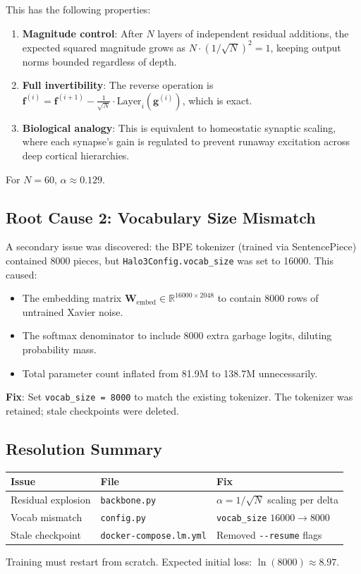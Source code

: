 This has the following properties:
\begin{enumerate}
    \item \textbf{Magnitude control}: After $N$ layers of independent residual additions, the expected squared magnitude grows as $N \cdot (1/\sqrt{N})^2 = 1$, keeping output norms bounded regardless of depth.
    \item \textbf{Full invertibility}: The reverse operation is $\mathbf{f}^{(i)} = \mathbf{f}^{(i+1)} - \frac{1}{\sqrt{N}} \cdot \text{Layer}_i(\mathbf{g}^{(i)})$, which is exact.
    \item \textbf{Biological analogy}: This is equivalent to homeostatic synaptic scaling, where each synapse's gain is regulated to prevent runaway excitation across deep cortical hierarchies.
\end{enumerate}

For $N = 60$, $\alpha \approx 0.129$.

\subsection{Root Cause 2: Vocabulary Size Mismatch}

A secondary issue was discovered: the BPE tokenizer (trained via SentencePiece) contained 8000 pieces, but \texttt{Halo3Config.vocab\_size} was set to 16000. This caused:
\begin{itemize}
    \item The embedding matrix $\mathbf{W}_{\text{embed}} \in \mathbb{R}^{16000 \times 2048}$ to contain 8000 rows of untrained Xavier noise.
    \item The softmax denominator to include 8000 extra garbage logits, diluting probability mass.
    \item Total parameter count inflated from 81.9M to 138.7M unnecessarily.
\end{itemize}

\textbf{Fix}: Set \texttt{vocab\_size = 8000} to match the existing tokenizer. The tokenizer was retained; stale checkpoints were deleted.

\subsection{Resolution Summary}

\begin{center}
\begin{tabular}{lll}
\hline
\textbf{Issue} & \textbf{File} & \textbf{Fix} \\
\hline
Residual explosion & \texttt{backbone.py} & $\alpha = 1/\sqrt{N}$ scaling per delta \\
Vocab mismatch & \texttt{config.py} & \texttt{vocab\_size} $16000 \to 8000$ \\
Stale checkpoint & \texttt{docker-compose.lm.yml} & Removed \texttt{-{}-resume} flags \\
\hline
\end{tabular}
\end{center}

Training must restart from scratch. Expected initial loss: $\ln(8000) \approx 8.97$.
